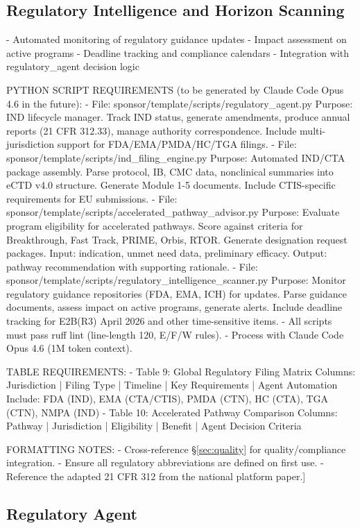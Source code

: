 \subsection{Regulatory Intelligence and Horizon Scanning}
- Automated monitoring of regulatory guidance updates
- Impact assessment on active programs
- Deadline tracking and compliance calendars
- Integration with regulatory\_agent decision logic

PYTHON SCRIPT REQUIREMENTS (to be generated by Claude Code Opus 4.6 in the future):
- File: sponsor/template/scripts/regulatory\_agent.py
  Purpose: IND lifecycle manager. Track IND status, generate amendments, produce
  annual reports (21 CFR 312.33), manage authority correspondence. Include
  multi-jurisdiction support for FDA/EMA/PMDA/HC/TGA filings.
- File: sponsor/template/scripts/ind\_filing\_engine.py
  Purpose: Automated IND/CTA package assembly. Parse protocol, IB, CMC data,
  nonclinical summaries into eCTD v4.0 structure. Generate Module 1-5 documents.
  Include CTIS-specific requirements for EU submissions.
- File: sponsor/template/scripts/accelerated\_pathway\_advisor.py
  Purpose: Evaluate program eligibility for accelerated pathways. Score against
  criteria for Breakthrough, Fast Track, PRIME, Orbis, RTOR. Generate
  designation request packages. Input: indication, unmet need data, preliminary
  efficacy. Output: pathway recommendation with supporting rationale.
- File: sponsor/template/scripts/regulatory\_intelligence\_scanner.py
  Purpose: Monitor regulatory guidance repositories (FDA, EMA, ICH) for updates.
  Parse guidance documents, assess impact on active programs, generate alerts.
  Include deadline tracking for E2B(R3) April 2026 and other time-sensitive items.
- All scripts must pass ruff lint (line-length 120, E/F/W rules).
- Process with Claude Code Opus 4.6 (1M token context).

TABLE REQUIREMENTS:
- Table 9: Global Regulatory Filing Matrix
  Columns: Jurisdiction | Filing Type | Timeline | Key Requirements | Agent Automation
  Include: FDA (IND), EMA (CTA/CTIS), PMDA (CTN), HC (CTA), TGA (CTN), NMPA (IND)
- Table 10: Accelerated Pathway Comparison
  Columns: Pathway | Jurisdiction | Eligibility | Benefit | Agent Decision Criteria

FORMATTING NOTES:
- Cross-reference \S\ref{sec:quality} for quality/compliance integration.
- Ensure all regulatory abbreviations are defined on first use.
- Reference the adapted 21 CFR 312 from the national platform paper.]

\subsection{Regulatory Agent}

